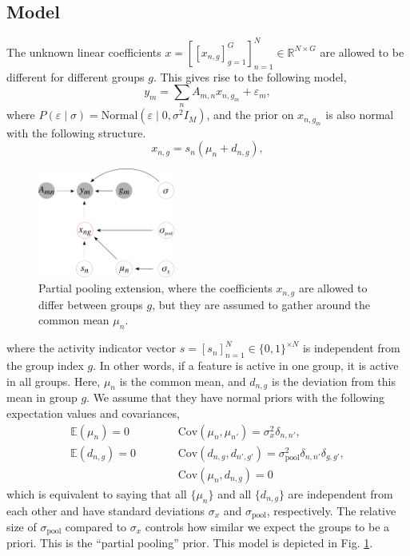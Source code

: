 \documentclass[letter,10pt,oneside]{article}
\newcommand{\bel}{\begin{equation}}
\newcommand{\eel}{\end{equation}}
\newcommand{\ba}{\begin{eqnarray*}}
\newcommand{\ea}{\end{eqnarray*}}
\newcommand{\+}{^\dagger}
\newcommand{\reffig}[1]{Fig. \ref{#1}}
\begin{document}
\subsection{Model}
The unknown linear coefficients $x = [[x_{n,g}]_{g=1}^G]_{n=1}^N \in \mathds{R}^{N\times G}$ are allowed to be different for different groups $g$. This gives rise to the following model,
\bel
  y_m = \sum_n A_{m,n} x_{n, g_m} + \varepsilon_m,
\eel
where $P(\varepsilon\;|\;\sigma) = \text{Normal}(\varepsilon\;|\; 0, \sigma^2 I_M)$, and the prior on $x_{n, g_m}$ is also normal with the following structure.
\bel
  x_{n, g} = s_n(\mu_n + d_{n, g}),
\eel
\begin{figure}[h]
\centering
  \includegraphics[width=0.4\textwidth]{figs/model-partial-pooling.pdf}
  \caption{
    \label{fig:partial-pooling}
    Partial pooling extension, where the coefficients $x_{n,g}$ are allowed to differ between groups $g$, but they are assumed to gather around the common mean $\mu_n$.
  }
\end{figure}
where the activity indicator vector $s = [s_n]_{n=1}^{N} \in \{0,1\}^{\times N}$ is independent from the group index $g$. In other words, if a feature is active in one group, it is active in all groups.
Here, $\mu_n$ is the common mean, and $d_{n, g}$ is the deviation from this mean in group $g$. We assume that they have normal priors with the following expectation values and covariances,
\ba
  \mathbb{E}(\mu_n) = 0\,\quad && \quad \text{Cov}(\mu_n, \mu_{n'}) = \sigma_x^2\delta_{n,n'}, \\
  \mathbb{E}(d_{n,g}) = 0\,\quad && \quad \text{Cov}(d_{n,g}, d_{n',g'}) = \sigma_\text{pool}^2 \delta_{n,n'}\delta_{g,g'}, \\
  && \quad \text{Cov}(\mu_n, d_{n,g}) = 0
\ea
which is equivalent to saying that all $\{\mu_n\}$ and all $\{d_{n,g}\}$ are independent from each other and have standard deviations $\sigma_x$ and $\sigma_\text{pool}$, respectively. The relative size of $\sigma_\text{pool}$ compared to $\sigma_x$ controls how similar we expect the groups to be a priori. This is the ``partial pooling'' prior. This model is depicted in \reffig{fig:partial-pooling}.
\end{document}
